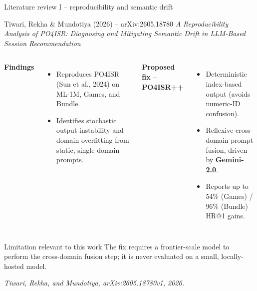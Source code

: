 \documentclass[aspectratio=169,12pt]{beamer}
\newcommand{\source}[1]{\vspace{0.35em}\par{\tiny\color{Muted}\textit{#1}}}
\begin{document}
\begin{frame}{Literature review I -- reproducibility and semantic drift}
\begin{block}{Tiwari, Rekha \& Mundotiya (2026) -- arXiv:2605.18780}
\emph{A Reproducibility Analysis of PO4ISR: Diagnosing and Mitigating
Semantic Drift in LLM-Based Session Recommendation}
\end{block}

\begin{columns}[T]
\textbf{Findings}
\begin{itemize}
  \item Reproduces PO4ISR (Sun et al., 2024) on ML-1M, Games, and Bundle.
  \item Identifies stochastic output instability and domain overfitting
        from static, single-domain prompts.
\end{itemize}

\textbf{Proposed fix -- PO4ISR++}
\begin{itemize}
  \item Deterministic index-based output (avoids numeric-ID confusion).
  \item Reflexive cross-domain prompt fusion, driven by \textbf{Gemini-2.0}.
  \item Reports up to 54\% (Games) / 96\% (Bundle) HR@1 gains.
\end{itemize}
\end{columns}

\vspace{0.5em}
\begin{alertblock}{Limitation relevant to this work}
The fix requires a frontier-scale model to perform the cross-domain
fusion step; it is never evaluated on a small, locally-hosted model.
\end{alertblock}
\source{Tiwari, Rekha, and Mundotiya, arXiv:2605.18780v1, 2026.}
\end{frame}
\end{document}
